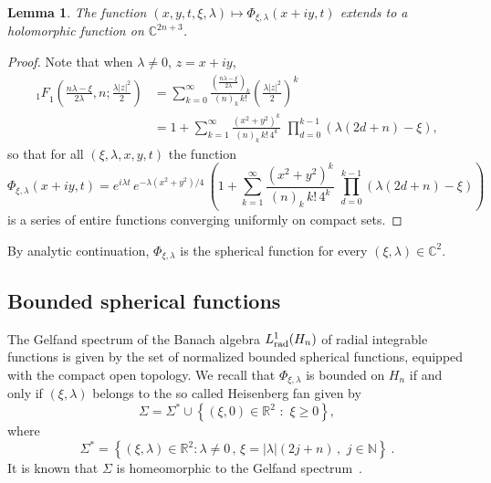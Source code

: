 \documentclass[12pt,a4paper]{amsart}
\theoremstyle{plain}
\newtheorem{lemma}[theorem]{Lemma}
\theoremstyle{definition}
\numberwithin{equation}{section}
\begin{document}
\begin{lemma}\label{olosferiche}
The function  $(x,y,t,\xi,{\lambda})\longmapsto   
\Phi_{\xi,{\lambda}}(x+iy,t)$ extends to a holomorphic function on 
${\mathbb C}^{2{n}+3}$.
\end{lemma}

\begin{proof}
Note that when ${\lambda}\not=0$, $z=x+iy$,
$$
\begin{aligned}
{ {_{1} F}_{\!1}} \left(\frac{{n} {\lambda}-\xi}{2 {\lambda}},{n};\frac{{\lambda} |z|^2}{2}\right)
&= 
\sum_{k=0}^{\infty}
\frac{\left( 
\frac{{n} {\lambda}-\xi}{2 {\lambda}}
\right)_k}
{(n)_k\,k! }
   \left(
 \frac{{\lambda} |z|^2}{2}
 \right)^k 
 \\
  &=1+
\sum_{k=1}^{\infty}
\frac{(x^2+y^2)^{k}}{(n)_k\,k!\,4^k}\,\,
\prod_{d=0}^{k-1}\left(
  {\lambda}(2d+{n})-\xi  \right)
,
  \end{aligned}
$$ 
so that for all $(\xi,{\lambda},x,y,t)$ the function
\begin{equation}\label{Phi}
\Phi_{\xi,{\lambda}}(x+iy,t)
=e^{i{\lambda} t}\, e^{-{\lambda} (x^2+y^2)/4}\, \left(1+
\sum_{k=1}^{\infty}
\frac{(x^2+y^2)^{k}}{(n)_k\,k!\,4^k}\,\,
\prod_{d=0}^{k-1}\left(
  {\lambda}(2d+{n})-\xi  \right)\right)
\end{equation}
is a series of entire functions converging  uniformly
on compact sets.
\end{proof}

By analytic continuation, $\Phi_{\xi,{\lambda}}$ 
is the spherical function for every $(\xi,{\lambda})\in{\mathbb C}^2$.

\subsection{Bounded spherical functions} 
 The Gelfand spectrum of the Banach algebra ${L^1_{\text{\rm rad}}({{H_{n}}})}$ of radial integrable functions  
is given by the set 
  of normalized bounded spherical functions, equipped with the compact open topology.   
 We recall
  \cite{Kora}  that  $\Phi_{\xi,{\lambda}}$ is bounded on ${{H_{n}}}$ 
  if and only if $(\xi,{\lambda})$ 
belongs to the so called  Heisenberg fan  given by
\begin{equation}\label{cfan}
{\Sigma}={{\Sigma^*}}\cup {\left\{{(\xi,0)\in {\mathbb R}^2\,\,:\,\, \xi\geq 0}\right\}},
\end{equation}
where
$$
{{\Sigma^*}}={\left\{{(\xi,{\lambda})\in{\mathbb R}^2:{\lambda}\ne0\,,\, \xi=|{\lambda}|(2j+ {n})\,,\, \,  j\in {\mathbb N} }\right\}}\ .
$$
It is known that ${\Sigma}$ is homeomorphic to  the Gelfand spectrum~\cite{FR, BJRW}. 
{{}}
 
\end{document}
